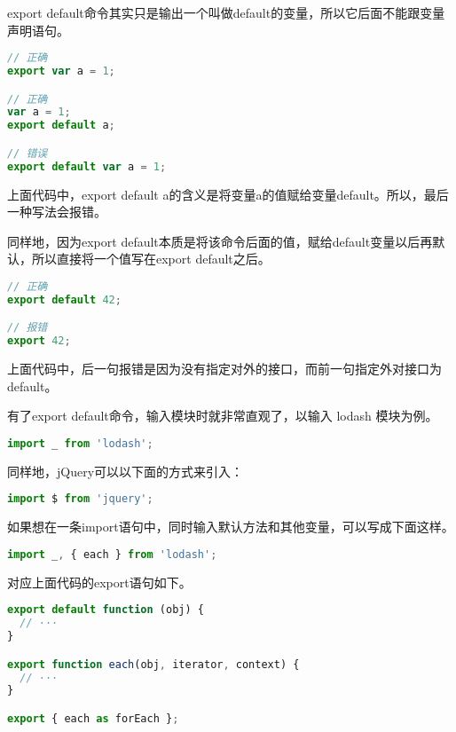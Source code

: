 export default命令其实只是输出一个叫做default的变量，所以它后面不能跟变量声明语句。


\begin{lstlisting}[language=JavaScript]
// 正确
export var a = 1;

// 正确
var a = 1;
export default a;

// 错误
export default var a = 1;
\end{lstlisting}


上面代码中，export default a的含义是将变量a的值赋给变量default。所以，最后一种写法会报错。

同样地，因为export default本质是将该命令后面的值，赋给default变量以后再默认，所以直接将一个值写在export default之后。


\begin{lstlisting}[language=JavaScript]
// 正确
export default 42;

// 报错
export 42;
\end{lstlisting}

上面代码中，后一句报错是因为没有指定对外的接口，而前一句指定外对接口为default。

有了export default命令，输入模块时就非常直观了，以输入 lodash 模块为例。

\begin{lstlisting}[language=JavaScript]
import _ from 'lodash';
\end{lstlisting}



同样地，jQuery可以以下面的方式来引入：




\begin{lstlisting}[language=JavaScript]
import $ from 'jquery';
\end{lstlisting}

如果想在一条import语句中，同时输入默认方法和其他变量，可以写成下面这样。


\begin{lstlisting}[language=JavaScript]
import _, { each } from 'lodash';
\end{lstlisting}

对应上面代码的export语句如下。


\begin{lstlisting}[language=JavaScript]
export default function (obj) {
  // ···
}

export function each(obj, iterator, context) {
  // ···
}

export { each as forEach };
\end{lstlisting}

